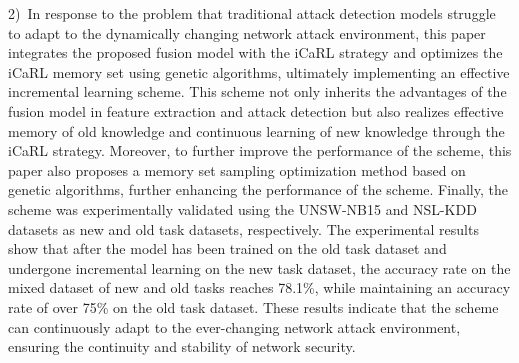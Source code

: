 \begin{eabstract}
    2)~In response to the problem that traditional attack detection models struggle to adapt to the dynamically changing network attack environment, this paper integrates the proposed fusion model with the iCaRL strategy and optimizes the iCaRL memory set using genetic algorithms, ultimately implementing an effective incremental learning scheme. This scheme not only inherits the advantages of the fusion model in feature extraction and attack detection but also realizes effective memory of old knowledge and continuous learning of new knowledge through the iCaRL strategy. Moreover, to further improve the performance of the scheme, this paper also proposes a memory set sampling optimization method based on genetic algorithms, further enhancing the performance of the scheme. Finally, the scheme was experimentally validated using the UNSW-NB15 and NSL-KDD datasets as new and old task datasets, respectively. The experimental results show that after the model has been trained on the old task dataset and undergone incremental learning on the new task dataset, the accuracy rate on the mixed dataset of new and old tasks reaches 78.1\%, while maintaining an accuracy rate of over 75\% on the old task dataset. These results indicate that the scheme can continuously adapt to the ever-changing network attack environment, ensuring the continuity and stability of network security.
    

\end{eabstract}
